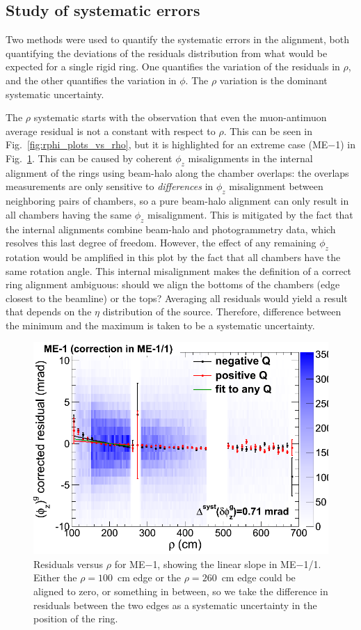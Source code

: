\documentclass[12pt]{article}
\begin{document}
\subsection{Study of systematic errors}
\label{sec:systematic_errors}

Two methods were used to quantify the systematic errors in the
alignment, both quantifying the deviations of the residuals
distribution from what would be expected for a single rigid ring.  One
quantifies the variation of the residuals in $\rho$, and the other
quantifies the variation in $\phi$.  The $\rho$ variation is the
dominant systematic uncertainty.

The $\rho$ systematic starts with the observation that even the
muon-antimuon average residual is not a constant with respect to
$\rho$.  This can be seen in Fig.~\ref{fig:rphi_plots_vs_rho}, but it
is highlighted for an extreme case (ME$-$1) in
Fig.~\ref{fig:vsmomentum_correction}.  This can be caused by coherent
$\phi_z$ misalignments in the internal alignment of the rings using
beam-halo along the chamber overlaps: the overlaps measurements are
only sensitive to {\it differences} in $\phi_z$ misalignment between
neighboring pairs of chambers, so a pure beam-halo alignment can only
result in all chambers having the same $\phi_z$ misalignment.  This is
mitigated by the fact that the internal alignments combine beam-halo
and photogrammetry data, which resolves this last degree of freedom.
However, the effect of any remaining $\phi_z$ rotation would be
amplified in this plot by the fact that all chambers have the same
rotation angle.  This internal misalignment makes the definition of a
correct ring alignment ambiguous: should we align the bottoms of the
chambers (edge closest to the beamline) or the tops?  Averaging all
residuals would yield a result that depends on the $\eta$ distribution
of the source.  Therefore, difference between the minimum and the
maximum is taken to be a systematic uncertainty.

\begin{figure}
\begin{center}
\includegraphics[height=6 cm]{vsmomentum_correction.png}
\end{center}

\caption{Residuals versus $\rho$ for ME$-$1, showing the linear slope
  in ME$-$1/1.  Either the $\rho=100$~cm edge or the $\rho=260$~cm
  edge could be aligned to zero, or something in between, so we take
  the difference in residuals between the two edges as a systematic
  uncertainty in the position of the ring. \label{fig:vsmomentum_correction}}
\end{figure}
\end{document}
